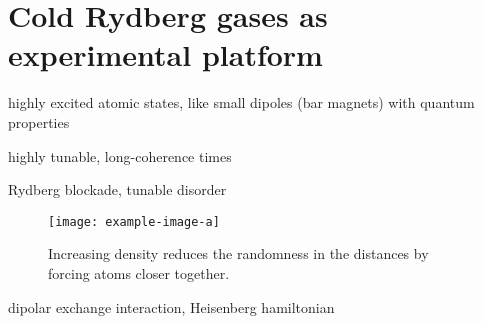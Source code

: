 \chapter{Cold Rydberg gases as experimental platform}
highly excited atomic states, like small dipoles  (bar magnets) with quantum properties

highly tunable, long-coherence times

Rydberg blockade, tunable disorder

\begin{figure}[htb]
	\centering
	\texttt{[image: example-image-a]}
	\caption{Increasing density reduces the randomness in the distances by forcing atoms closer together.}
\end{figure}

dipolar exchange interaction, Heisenberg hamiltonian